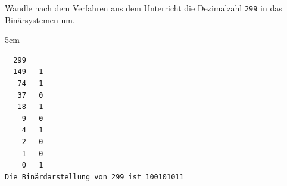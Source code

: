\question[2]
Wandle nach dem Verfahren aus dem Unterricht die Dezimalzahl \texttt{299} in das Binärsystemen um.
\begin{solutionbox}{5cm}
\begin{lstlisting}
  299
  149   1
   74   1
   37   0
   18   1
    9   0
    4   1
    2   0
    1   0
    0   1
Die Binärdarstellung von 299 ist 100101011
\end{lstlisting}
\end{solutionbox}
